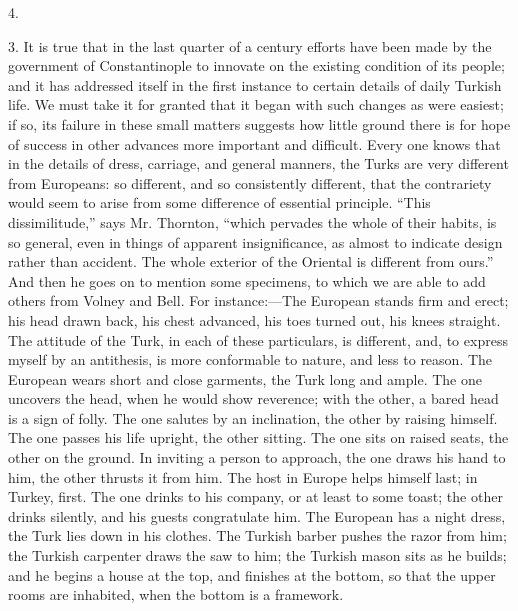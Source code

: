 4.

3. It is true that in the last
quarter of a century efforts have been made by the government of
Constantinople to innovate on the existing condition of its people;
and it has addressed itself in the first instance to certain details
of daily Turkish life. We must take it for granted that it began with
such changes as were easiest; if so, its failure in these small
matters suggests how little ground there is for hope of success in
other advances more important and difficult. Every one knows that in
the details of dress, carriage, and general manners, the Turks are
very different from Europeans: so different, and so consistently
different, that the contrariety would seem to arise from some
difference of essential principle. ``This dissimilitude,'' says Mr.
Thornton, ``which pervades the whole of their habits, is so general,
even in things of apparent insignificance, as almost to indicate
design rather than accident. The whole exterior of the Oriental is
different from ours.'' And then he goes on to mention some specimens,
to which we are able to add others from Volney and Bell. For
instance:—The European stands firm and erect; his head drawn back,
his chest advanced, his toes turned out, his knees straight. The
attitude of the Turk, in each of these particulars, is different, and,
to express myself by an antithesis, is more conformable to nature, and
less to reason. The European wears short and close garments, the Turk
long and ample. The one uncovers the head, when he would show
reverence; with the other, a bared head is a sign of folly. The one
salutes by an inclination, the other by raising himself. The one
passes his life upright, the other sitting. The one sits on raised
seats, the other on the ground. In inviting a person to approach, the
one draws his hand to him, the other thrusts it from him. The host in
Europe helps himself last; in Turkey, first. The one drinks to his
company, or at least to some toast; the other drinks silently, and his
guests congratulate him. The European has a night dress, the Turk lies
down in his clothes. The Turkish barber pushes the razor from him; the
Turkish carpenter draws the saw to him; the Turkish mason sits as he
builds; and he begins a house at the top, and finishes at the
bottom, so that the upper rooms are inhabited, when the bottom is a
framework.

